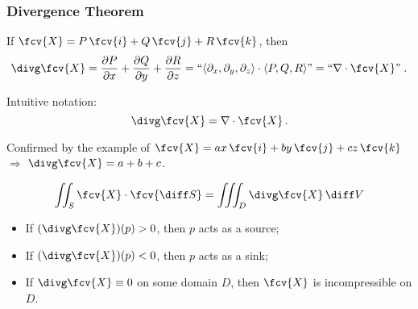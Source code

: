 \begin{frame}
  \frametitle{Divergence Theorem}

%
If $\fcv{X} = P\, \fcv{i} + Q\, \fcv{j} +R\, \fcv{k}$, then
%
$$\divg \fcv{X} = \frac{\partial P}{\partial x}+ \frac{\partial Q}{\partial y} + \frac{\partial R}{\partial z}  = ``\langle \partial_x, \partial_y, \partial_z \rangle \cdot \langle P, Q, R\rangle" =  ``\nabla \cdot \fcv{X}"\; .$$

Intuitive notation:
%
$$\divg \fcv{X} = \nabla \cdot \fcv{X}\, .$$

\pause Confirmed by the example of $\fcv{X} = ax \, \fcv{i} + by\, \fcv{j} + cz\, \fcv{k}$ $\Longrightarrow$ $\divg \fcv{X} = a+b+c$.\pause

\begin{theorem}
$$\iint_S \fcv{X} \cdot \fcv{\diff S} = \iiint_D \divg \fcv{X} \, \diff V$$
\end{theorem}

\begin{itemize}
  \item \pause If $(\divg \fcv{X})(p)>0$, then \pause $p$ acts as a source;
  \item \pause If $(\divg \fcv{X})(p)<0$, then \pause $p$ acts as a sink;
  \item \pause If $\divg \fcv{X} \equiv 0$ on some domain $D$, then \pause $\fcv{X}$ is incompressible on $D$.
\end{itemize}

\end{frame}

